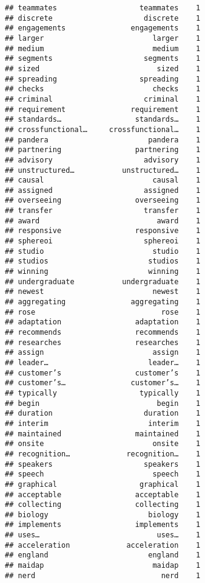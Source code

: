 \documentclass[]{article}
\begin{document}
\begin{verbatim}
## teammates                   teammates    1
## discrete                     discrete    1
## engagements               engagements    1
## larger                         larger    1
## medium                         medium    1
## segments                     segments    1
## sized                           sized    1
## spreading                   spreading    1
## checks                         checks    1
## criminal                     criminal    1
## requirement               requirement    1
## standards…                 standards…    1
## crossfunctional…     crossfunctional…    1
## pandera                       pandera    1
## partnering                 partnering    1
## advisory                     advisory    1
## unstructured…           unstructured…    1
## causal                         causal    1
## assigned                     assigned    1
## overseeing                 overseeing    1
## transfer                     transfer    1
## award                           award    1
## responsive                 responsive    1
## sphereoi                     sphereoi    1
## studio                         studio    1
## studios                       studios    1
## winning                       winning    1
## undergraduate           undergraduate    1
## newest                         newest    1
## aggregating               aggregating    1
## rose                             rose    1
## adaptation                 adaptation    1
## recommends                 recommends    1
## researches                 researches    1
## assign                         assign    1
## leader…                       leader…    1
## customer’s                 customer’s    1
## customer’s…               customer’s…    1
## typically                   typically    1
## begin                           begin    1
## duration                     duration    1
## interim                       interim    1
## maintained                 maintained    1
## onsite                         onsite    1
## recognition…             recognition…    1
## speakers                     speakers    1
## speech                         speech    1
## graphical                   graphical    1
## acceptable                 acceptable    1
## collecting                 collecting    1
## biology                       biology    1
## implements                 implements    1
## uses…                           uses…    1
## acceleration             acceleration    1
## england                       england    1
## maidap                         maidap    1
## nerd                             nerd    1

\end{verbatim}
\end{document}
